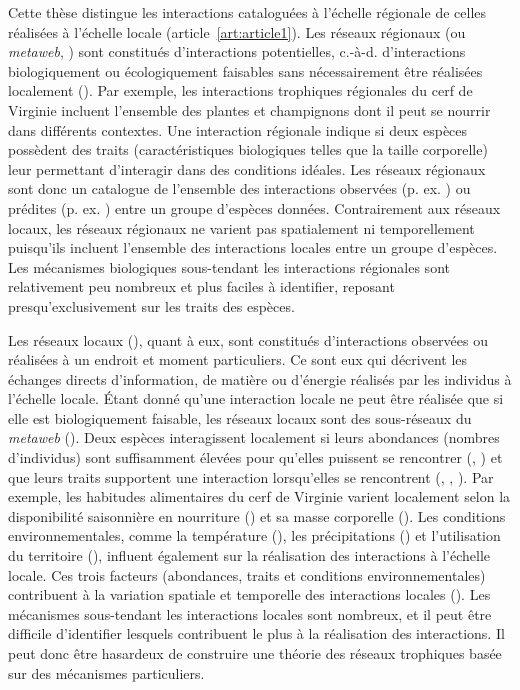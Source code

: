 Cette thèse distingue les interactions cataloguées à l'échelle régionale de
celles réalisées à l'échelle locale (article~\ref{art:article1}). Les réseaux
régionaux (ou \textit{metaweb}, \cite{Pascual2006Ecological}) sont constitués
d'interactions potentielles, c.-à-d. d'interactions biologiquement ou
écologiquement faisables sans nécessairement être réalisées localement
(\cite{Tylianakis2017Ecological}). Par exemple, les interactions trophiques
régionales du cerf de Virginie incluent l'ensemble des plantes et champignons
dont il peut se nourrir dans différents contextes. Une interaction régionale
indique si deux espèces possèdent des traits (caractéristiques biologiques
telles que la taille corporelle) leur permettant d'interagir dans des conditions
idéales. Les réseaux régionaux sont donc un catalogue de l'ensemble des
interactions observées (p. ex. \cite{Maiorano2020Tetraeu}) ou prédites (p. ex.
\cite{Strydom2022Food}) entre un groupe d'espèces données. Contrairement aux
réseaux locaux, les réseaux régionaux ne varient pas spatialement ni
temporellement puisqu'ils incluent l'ensemble des interactions locales entre un
groupe d'espèces. Les mécanismes biologiques sous-tendant les interactions
régionales sont relativement peu nombreux et plus faciles à identifier, reposant
presqu'exclusivement sur les traits des espèces. 

Les réseaux locaux (\cite{Poisot2012Dissimilarity}), quant à eux, sont
constitués d'interactions observées ou réalisées à un endroit et moment
particuliers. Ce sont eux qui décrivent les échanges directs d'information, de
matière ou d'énergie réalisés par les individus à l'échelle locale. Étant donné
qu'une interaction locale ne peut être réalisée que si elle est biologiquement
faisable, les réseaux locaux sont des sous-réseaux du \textit{metaweb}
(\cite{Saravia2022Ecological}). Deux espèces interagissent localement si leurs
abondances (nombres d'individus) sont suffisamment élevées pour qu'elles
puissent se rencontrer (\cite{Canard2012Emergence}, \cite{Canard2014Empirical})
et que leurs traits supportent une interaction lorsqu'elles se rencontrent
(\cite{Bolnick2011Why}, \cite{Gravel2013Inferring}, \cite{Stouffer2011Role}).
Par exemple, les habitudes alimentaires du cerf de Virginie varient localement
selon la disponibilité saisonnière en nourriture (\cite{Short1975Nutrition}) et
sa masse corporelle (\cite{Luna2013Influence}). Les conditions
environnementales, comme la température (\cite{Angilletta2004Temperature}), les
précipitations (\cite{Woodward2012Climate}) et l'utilisation du territoire
(\cite{Tylianakis2007Habitat}), influent également sur la réalisation des
interactions à l'échelle locale. Ces trois facteurs (abondances, traits et
conditions environnementales) contribuent à la variation spatiale et temporelle
des interactions locales (\cite{Poisot2015Species}). Les mécanismes sous-tendant
les interactions locales sont nombreux, et il peut être difficile d'identifier
lesquels contribuent le plus à la réalisation des interactions. Il peut donc
être hasardeux de construire une théorie des réseaux trophiques basée sur des
mécanismes particuliers.  

